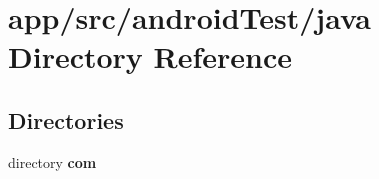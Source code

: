 \section{app/src/android\+Test/java Directory Reference}
\label{dir_d9b3b22ed3c18ffbffa0cc9c6b29c1a8}
\subsection*{Directories}
\begin{DoxyCompactItemize}
\item 
directory {\bf com}
\end{DoxyCompactItemize}
